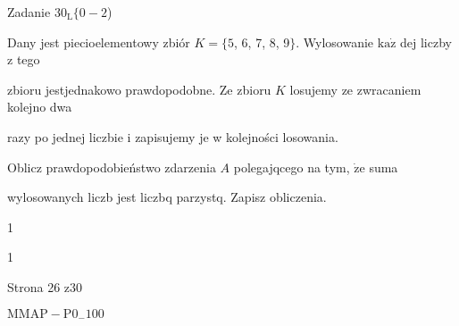 \documentclass[a4paper,12pt]{article}
\begin{document}
Zadanie $30_{\mathrm{L}}\{0-2$)

Dany jest piecioelementowy zbiór $K=\{5$, 6, 7, 8, 9$\}$. Wylosowanie $\mathrm{k}\mathrm{a}\dot{\mathrm{z}}$ dej liczby z tego

zbioru jestjednakowo prawdopodobne. Ze zbioru $K$ losujemy ze zwracaniem kolejno dwa

razy po jednej liczbie i zapisujemy je w kolejności losowania.

Oblicz prawdopodobieństwo zdarzenia $A$ polegajqcego na tym, $\dot{\mathrm{z}}\mathrm{e}$ suma

wylosowanych liczb jest liczbq parzystq. Zapisz obliczenia.

1

1

Strona 26 z30

$\mathrm{M}\mathrm{M}\mathrm{A}\mathrm{P}-\mathrm{P}0_{-}100$
\end{document}
